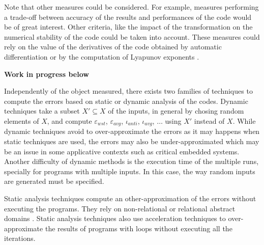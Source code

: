 Note that other measures could be considered. For example, measures performing a trade-off between accuracy of the
results and performances of the code would be of great interest. Other criteria, like the impact of the transformation
on the numerical stability of the code could be taken into account. These measures could rely on the value
of the derivatives of the code obtained by automatic differentiation \cite{} or by the computation of Lyapunov exponents \cite{}.


\textbf{\large Work in progress below}

Independently of the object measured,
there exists two families of techniques to compute the errors based on static or dynamic analysis of the codes.
Dynamic techniques take a subset $X' \subseteq X$ of the inputs, in general by chosing random elements of $X$,
and compute $\varepsilon_{wst}$,  $\varepsilon_{avg}$, $\iota_{anti}$, $\iota_{avg}$, $\ldots$ using $X'$
instead of $X$. While dynamic techniques avoid to over-approximate the errors as it may happens when static 
techniques are used, the errors may also be under-approximated which may be an issue in some applicative
contexts such as critical embedded systems. Another difficulty of dynamic methods is the execution time of the
multiple runs, specially for programs with multiple inputs. In this case, the way random inputs are generated
must be specified. 

Static analysis techniques compute an other-approximation of the errors without executing the programs. They rely
on non-relational \cite{} or relational abstract domains \cite{}. Static analysis techniques also use 
acceleration techniques to over-approximate the results of programs with loops without executing all the iterations.












